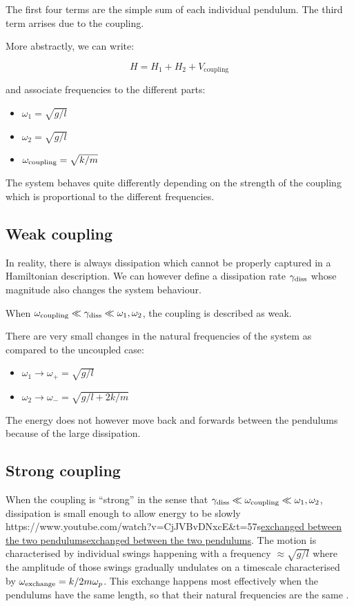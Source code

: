 \documentclass[
]{article}
\let\oldhref\href
\renewcommand{\href}[2]{\ifx#1\urlprefix\oldhref{#1}{#2}\else\uline{\oldhref{#1}{#2}}\fi}
\renewcommand{\[}{\begin{equation}}
\renewcommand{\]}{\end{equation}}
\providecommand{\tightlist}{%
  \setlength{\itemsep}{0pt}\setlength{\parskip}{0pt}}
\begin{document}
The first four terms are the simple sum of each individual pendulum. The
third term arrises due to the coupling.

More abstractly, we can write:

\[
H = H_1 + H_2+ V_{\text{coupling}}
\]

and associate frequencies to the different parts:

\begin{itemize}
\tightlist
\item
  \(\omega_1 = \sqrt{g/l}\)
\item
  \(\omega_2 = \sqrt{g/l}\)
\item
  \(\omega_{\rm coupling} = \sqrt{k/m}\)
\end{itemize}

The system behaves quite differently depending on the strength of the
coupling which is proportional to the different frequencies.

\subsection{Weak coupling}\label{weak-coupling}

In reality, there is always dissipation which cannot be properly
captured in a Hamiltonian description. We can however define a
dissipation rate \(\gamma_{\rm diss}\) whose magnitude also changes the
system behaviour.

When
\(\omega_{\rm coupling} \ll \gamma_{\rm diss} \ll \omega_1,\omega_2\),
the coupling is described as weak.

There are very small changes in the natural frequencies of the system as
compared to the uncoupled case:

\begin{itemize}
\tightlist
\item
  \(\omega_1 \rightarrow \omega_+ = \sqrt{g/l}\)
\item
  \(\omega_2 \rightarrow \omega_- = \sqrt{g/l + 2k/m}\)
\end{itemize}

The energy does not however move back and forwards between the pendulums
because of the large dissipation.

\subsection{Strong coupling}\label{strong-coupling}

When the coupling is ``strong'' in the sense that
\(\gamma_{\rm diss} \ll \omega_{\rm coupling} \ll \omega_1,\omega_2\),
dissipation is small enough to allow energy to be slowly
\href{https://www.youtube.com/watch?v=CjJVBvDNxcE&t=57s}{exchanged
between the two pendulums}. The motion is characterised by individual
swings happening with a frequency \(\approx \sqrt{g/l}\) where the
amplitude of those swings gradually undulates on a timescale
characterised by \(\omega_{\rm exchange} = k/2m\omega_p\). This exchange
happens most effectively when the pendulums have the same length, so
that their natural frequencies are the same .
\end{document}
